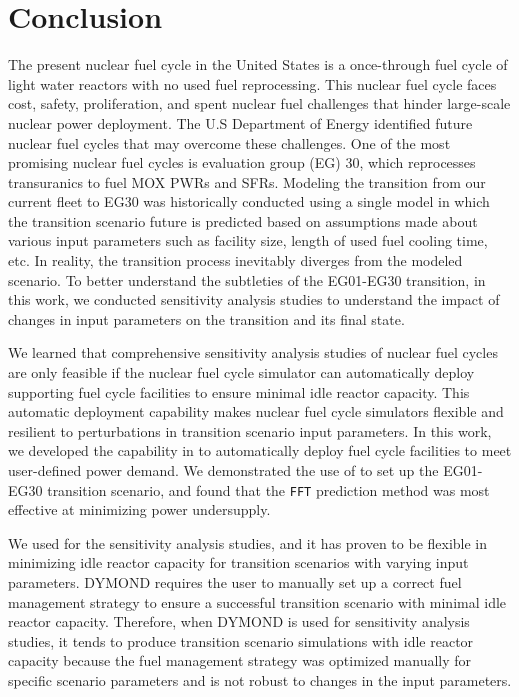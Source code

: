 \chapter{Conclusion}
The present nuclear fuel cycle in the United States is a once-through 
fuel cycle of light water reactors with no used fuel reprocessing. 
This nuclear fuel cycle faces cost, safety, proliferation, and spent nuclear fuel
challenges that hinder large-scale nuclear power deployment. 
The U.S Department of Energy identified future 
nuclear fuel cycles that may overcome these challenges.  
One of the most promising nuclear fuel cycles is evaluation group (EG) 30, 
which reprocesses transuranics to fuel \gls{MOX} \glspl{PWR}
and \glspl{SFR}. 
Modeling the transition from our current fleet to EG30 was historically 
conducted using a single model in which the transition scenario future 
is predicted based on assumptions made about various input parameters 
such as facility size, length of used fuel cooling time, etc. 
In reality, the transition process inevitably diverges from the 
modeled scenario. 
To better understand the subtleties of the EG01-EG30 transition,
in this work, we conducted sensitivity analysis studies to 
understand the impact of changes in input parameters on the transition 
and its final state. 

We learned that comprehensive sensitivity analysis studies of nuclear fuel cycles 
are only feasible if the nuclear fuel cycle simulator can 
automatically deploy supporting fuel cycle facilities 
to ensure minimal idle reactor capacity. 
This automatic deployment capability makes nuclear fuel cycle simulators 
flexible and resilient to 
perturbations in transition scenario input parameters. 
In this work, we developed the \deploy capability in \Cyclus to 
automatically deploy fuel cycle facilities to meet user-defined 
power demand. 
We demonstrated the use of \deploy to set up the EG01-EG30 transition scenario,
and found that the \texttt{FFT} prediction method was most effective at 
minimizing power undersupply. 

We used \deploy for the sensitivity analysis studies, and it has 
proven to be flexible in minimizing idle reactor capacity for 
transition scenarios with varying input parameters. 
DYMOND requires the user to manually set up a correct fuel management 
strategy to ensure a successful transition scenario with minimal 
idle reactor capacity. 
Therefore, when DYMOND is used for sensitivity analysis studies, it tends 
to produce transition scenario simulations with idle reactor capacity 
because the fuel management strategy was optimized manually for specific 
scenario parameters and is not robust to changes in the input parameters.

